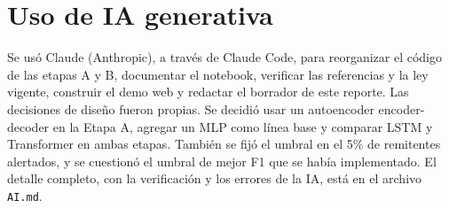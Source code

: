 \documentclass[11pt]{article}
\begin{document}
\section{Uso de IA generativa}

Se usó Claude (Anthropic), a través de Claude Code, para reorganizar el código de las etapas A y B, documentar el notebook, verificar las referencias y la ley vigente, construir el demo web y redactar el borrador de este reporte. Las decisiones de diseño fueron propias. Se decidió usar un autoencoder encoder-decoder en la Etapa A, agregar un MLP como línea base y comparar LSTM y Transformer en ambas etapas. También se fijó el umbral en el 5\% de remitentes alertados, y se cuestionó el umbral de mejor F1 que se había implementado. El detalle completo, con la verificación y los errores de la IA, está en el archivo \texttt{AI.md}.

\printbibliography
\end{document}
